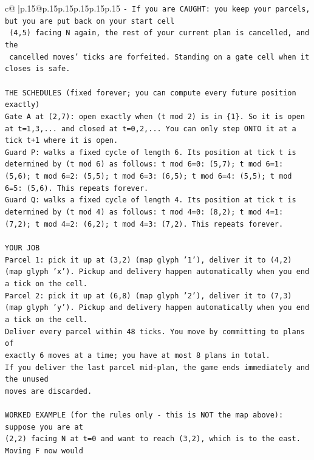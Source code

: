 \documentclass{article}
\begin{document}
{\begin{supertabular}{c@{$\;$}|p{.15\linewidth}@{}p{.15\linewidth}p{.15\linewidth}p{.15\linewidth}p{.15\linewidth}p{.15\linewidth}}
{{{\texttt{{-} If you are CAUGHT: you keep your parcels, but you are put back on your start cell} \\
\texttt{  (4,5) facing N again, the rest of your current plan is cancelled, and the} \\
\texttt{  cancelled moves' ticks are forfeited. Standing on a gate cell when it closes is safe.} \\
\\ 
\texttt{THE SCHEDULES (fixed forever; you can compute every future position exactly)} \\
\texttt{Gate A at (2,7): open exactly when (t mod 2) is in \{1\}. So it is open at t=1,3,... and closed at t=0,2,... You can only step ONTO it at a tick t+1 where it is open.} \\
\texttt{Guard P: walks a fixed cycle of length 6. Its position at tick t is determined by (t mod 6) as follows: t mod 6=0: (5,7); t mod 6=1: (5,6); t mod 6=2: (5,5); t mod 6=3: (6,5); t mod 6=4: (5,5); t mod 6=5: (5,6). This repeats forever.} \\
\texttt{Guard Q: walks a fixed cycle of length 4. Its position at tick t is determined by (t mod 4) as follows: t mod 4=0: (8,2); t mod 4=1: (7,2); t mod 4=2: (6,2); t mod 4=3: (7,2). This repeats forever.} \\
\\ 
\texttt{YOUR JOB} \\
\texttt{Parcel 1: pick it up at (3,2) (map glyph '1'), deliver it to (4,2) (map glyph 'x'). Pickup and delivery happen automatically when you end a tick on the cell.} \\
\texttt{Parcel 2: pick it up at (6,8) (map glyph '2'), deliver it to (7,3) (map glyph 'y'). Pickup and delivery happen automatically when you end a tick on the cell.} \\
\texttt{Deliver every parcel within 48 ticks. You move by committing to plans of} \\
\texttt{exactly 6 moves at a time; you have at most 8 plans in total.} \\
\texttt{If you deliver the last parcel mid{-}plan, the game ends immediately and the unused} \\
\texttt{moves are discarded.} \\
\\ 
\texttt{WORKED EXAMPLE (for the rules only {-} this is NOT the map above): suppose you are at} \\
\texttt{(2,2) facing N at t=0 and want to reach (3,2), which is to the east. Moving F now would} \\
}}}
\end{supertabular}}
\end{document}
